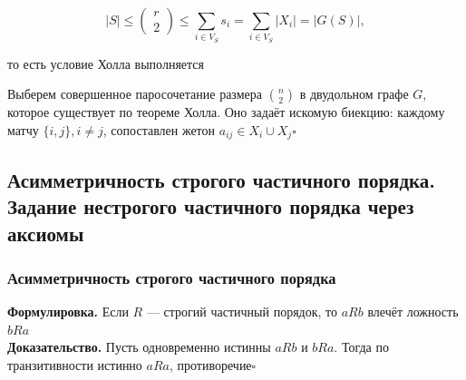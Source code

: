 \documentclass[a4paper]{article}
\newcommand{\qed}{\hfill$\square$}
\begin{document}
$$
|S| \leqslant\left(\begin{array}{l}
r \\
2
\end{array}\right) \leqslant \sum_{i \in V_{S}} s_{i}=\sum_{i \in V_{S}}\left|X_{i}\right|=|G(S)|,
$$

то есть условие Холла выполняется

Выберем совершенное паросочетание размера $\binom{n}{2}$ в двудольном графе $G$, которое существует по теореме Холла. 
Оно задаёт искомую биекцию: каждому матчу $\{i, j\}, i \neq j$, сопоставлен жетон $a_{i j} \in X_{i} \cup X_{j}$\qed








\subsection{Асимметричность строгого частичного порядка. Задание нестрогого частичного порядка через аксиомы}
\subsubsection*{Асимметричность строгого частичного порядка}
\textbf{Формулировка.} Если $R$ — строгий частичный порядок, то $aRb$ влечёт ложность $bRa$\\[2mm]
\indent\textbf{Доказательство.} Пусть одновременно истинны $aRb$ и $bRa$. Тогда по транзитивности истинно $aRa$, противоречие\qed
\end{document}

